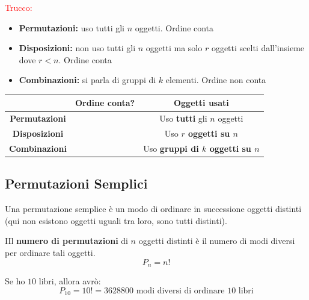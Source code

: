 \documentclass{article}  %
\theoremstyle{definition}
\begin{document}
\textcolor{red}{Trucco:}
\begin{itemize}
	\item \textbf{Permutazioni:} uso tutti gli $n$ oggetti. Ordine conta
	\item \textbf{Disposizioni:} non uso tutti gli $n$ oggetti ma solo $r$ oggetti scelti dall'insieme dove $r<n$. Ordine conta
	\item \textbf{Combinazioni:} si parla di gruppi di $k$ elementi. Ordine non conta
\end{itemize}

\renewcommand{\arraystretch}{1.6}
\begin{center}
	\begin{tabular}{|c|c|c|}
		\hline
		\textbf{} & \textbf{Ordine conta?}                        & \textbf{Oggetti usati} \\[6pt]
		\hline

		\textbf{Permutazioni}
		          & \textcolor{green}{\scalebox{1.6}{\checkmark}}
		          & Uso \textbf{tutti} gli $n$ oggetti                                     \\[8pt]

		\hline
		\textbf{Disposizioni}
		          & \textcolor{green}{\scalebox{1.6}{\checkmark}}
		          & Uso \textbf{$r$ oggetti su $n$}                                        \\[8pt]

		\hline
		\textbf{Combinazioni}
		          & \textcolor{red}{\scalebox{1.6}{\texttimes}}
		          & Uso \textbf{gruppi di $k$ oggetti su $n$}                              \\[8pt]

		\hline
	\end{tabular}
\end{center}



\subsection{Permutazioni Semplici}
Una permutazione semplice è un modo di ordinare in successione oggetti distinti (qui non esistono oggetti uguali tra loro, sono tutti distinti).
\begin{theorem}{}
	IIl \textbf{numero di permutazioni} di $n$ oggetti distinti è il
	numero di modi diversi per ordinare tali oggetti.
	\[
		P_n=n!
	\]
\end{theorem}

\begin{esercizio}[Esempio]
	Se ho $10$ libri, allora avrò:
	\[
		P_{10}=10!=3628800 \text{ modi diversi di ordinare 10 libri}
	\]
\end{esercizio}
\end{document}
